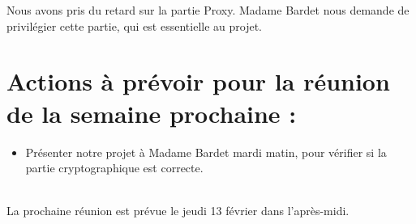 \documentclass[a4paper,11pt,french]{article}
\begin{document}
Nous avons pris du retard sur la partie Proxy. Madame Bardet nous demande de privilégier cette partie, qui est essentielle au projet.

\section{Actions à prévoir pour la réunion de la semaine prochaine :}
\begin{itemize}
  \item Présenter notre projet à Madame Bardet mardi matin, pour vérifier si la partie cryptographique est correcte.
\end{itemize}
~\\
La prochaine réunion est prévue le jeudi 13 février dans l'après-midi.
\end{document}
